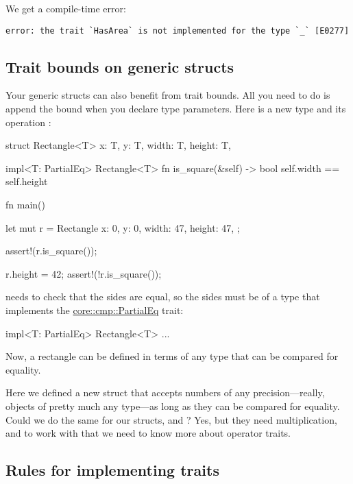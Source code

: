 We get a compile-time error:

\begin{verbatim}
error: the trait `HasArea` is not implemented for the type `_` [E0277]
\end{verbatim}

\subsection*{Trait bounds on generic structs}

Your generic structs can also benefit from trait bounds. All you need to do is append the bound when you declare type parameters. Here is a 
new type  and its operation :

\begin{rustc}
struct Rectangle<T> {
    x: T,
    y: T,
    width: T,
    height: T,
}

impl<T: PartialEq> Rectangle<T> {
    fn is_square(&self) -> bool {
        self.width == self.height
    }
}

fn main() {
    let mut r = Rectangle {
        x: 0,
        y: 0,
        width: 47,
        height: 47,
    };

    assert!(r.is_square());

    r.height = 42;
    assert!(!r.is_square());
}
\end{rustc}

 needs to check that the sides are equal, so the sides must be of a type that implements the 
\href{https://doc.rust-lang.org/core/cmp/trait.PartialEq.html}{core::cmp::PartialEq} trait:

\begin{rustc}
impl<T: PartialEq> Rectangle<T> { ... }
\end{rustc}

Now, a rectangle can be defined in terms of any type that can be compared for equality.

\blank

Here we defined a new struct  that accepts numbers of any precision—really, objects of pretty much any type—as long as they 
can be compared for equality. Could we do the same for our  structs,  and ? Yes, but they need
multiplication, and to work with that we need to know more about operator traits.

\subsection*{Rules for implementing traits}

